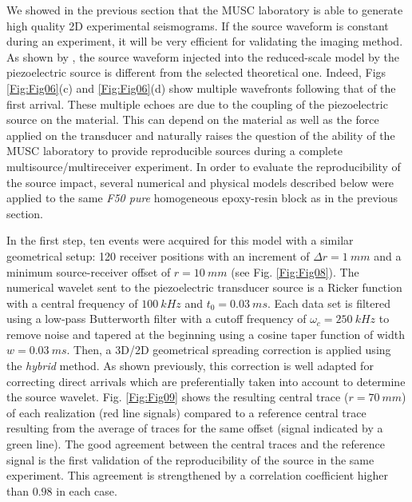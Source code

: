\documentclass[extra,mreferee]{gji}
\newenvironment{orangenote}{\par\color{Orange}}{\par}
\begin{document}
\begin{orangenote}
We showed in the previous section that the MUSC laboratory is able to generate high quality 2D experimental seismograms. If the source waveform is constant during an experiment, it will be very efficient for validating the imaging method. As shown by \cite{Bretaudeau_SSM_2011}, the source waveform injected into the reduced-scale model by the piezoelectric source is different from the selected theoretical one. Indeed, Figs \ref{Fig:Fig06}(c) and \ref{Fig:Fig06}(d) show multiple wavefronts following that of the first arrival. These multiple echoes are due to the coupling of the piezoelectric source on the material. This can depend on the material as well as the force applied on the transducer and naturally raises the question of the ability of the MUSC laboratory to provide reproducible sources during a complete multisource/multireceiver experiment. In order to evaluate the reproducibility of the source impact, several numerical and physical models described below were applied to the same \textit{F50 pure} homogeneous epoxy-resin block as in the previous section.

In the first step, ten events were acquired for this model with a similar geometrical setup: 120 receiver positions with an increment of $\Delta r= 1\ mm$ and a minimum source-receiver offset of $r=10\ mm$ (see Fig. \ref{Fig:Fig08}). The numerical wavelet sent to the piezoelectric transducer source is a Ricker function with a central frequency of $100\ kHz$ and $t_{0}=0.03\ ms$. Each data set is filtered using a low-pass Butterworth filter with a cutoff frequency of $\omega_{c}=250\ kHz$ to remove noise and tapered at the beginning using a cosine taper function of width $w=0.03\ ms$. Then, a 3D/2D geometrical spreading correction is applied using the \textit{hybrid} method. As shown previously, this correction is well adapted for correcting direct arrivals which are preferentially taken into account to determine the source wavelet. Fig. \ref{Fig:Fig09} shows the resulting central trace ($r=70\ mm$) of each realization (red line signals) compared to a reference central trace resulting from the average of traces for the same offset (signal indicated by a green line). The good agreement between the central traces and the reference signal is the first validation of the reproducibility of the source in the same experiment. This agreement is strengthened by a correlation coefficient higher than $0.98$ in each case. 


\end{orangenote}
\end{document}
